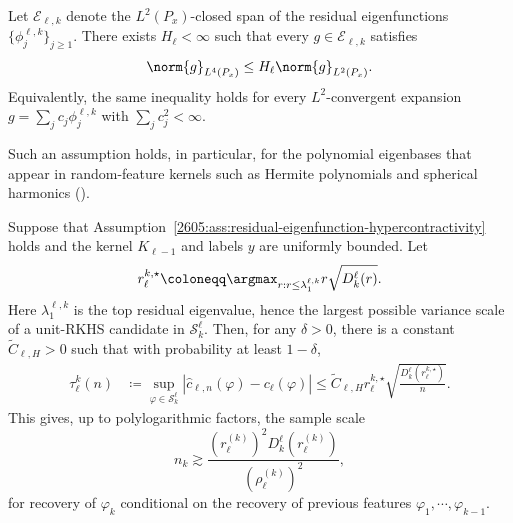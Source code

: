\begin{assumption}
\label{2605:ass:residual-eigenfunction-hypercontractivity}
Let \(\mathcal E_{\ell,k}\) denote the
\(L^2(P_x)\)-closed span of the residual eigenfunctions
\(\{\phi_j^{\ell,k}\}_{j\ge1}\). There exists \(H_\ell<\infty\) such that every
\(g\in\mathcal E_{\ell,k}\) satisfies
\[
    \norm{g}_{L^4(P_x)}
    \le
    H_\ell \norm{g}_{L^2(P_x)}.
\]
Equivalently, the same inequality holds for every \(L^2\)-convergent expansion
\(g=\sum_j c_j\phi_j^{\ell,k}\) with \(\sum_jc_j^2<\infty\).

\end{assumption}

Such an assumption holds, in particular, for the polynomial eigenbases that
appear in random-feature kernels such as Hermite polynomials and spherical harmonics (\cite{mei2022generalizationerror}).


\begin{theorem}
\label{2605:prop:emergence}
Suppose that Assumption~\ref{2605:ass:residual-eigenfunction-hypercontractivity}
holds and the kernel \(K_{\ell-1}\) and labels \(y\) are uniformly bounded. Let
\[
    r_\ell^{k,\star}
    \coloneqq
    \argmax_{r:  r \leq \lambda_1^{\ell,k}}
    r\sqrt{D^\ell_k(r)} .
\]
Here \(\lambda_1^{\ell,k}\) is the top residual eigenvalue, hence the largest
possible variance scale of a unit-RKHS candidate in \(\mathcal S^\ell_k\).
Then, for any \(\delta>0\), there is a constant
\(\widetilde C_{\ell,H}>0\) such that with probability at least \(1-\delta\),
\begin{equation}
    \begin{aligned}
     \tau^k_\ell(n)
     &\coloneqq
     \sup_{\varphi \in  \mathcal{S}^\ell_{k}}
    \left|
    \widehat c_{\ell,n}(\varphi)-c_\ell(\varphi)
    \right|
    \le
    \widetilde C_{\ell,H} 
    r_\ell^{k,\star}
    \sqrt{\frac{D^\ell_k(r_\ell^{k,\star})}{n}} .
    \end{aligned}
\end{equation} This gives, up to polylogarithmic factors, the sample
scale
\[
    n_k
    \gtrsim
    \frac{
        (r_\ell^{(k)})^2 D^\ell_k(r_\ell^{(k)})
    }{
        (\rho_\ell^{(k)})^2
    },
\]
for recovery of $\varphi_k$ conditional on the recovery of previous features $\varphi_1,\cdots,\varphi_{k-1}$.
\end{theorem}

